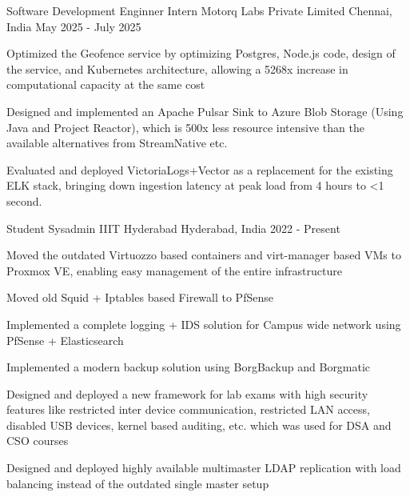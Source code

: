 
\begin{cventries}
  \cventry
  {Software Development Enginner Intern} %
  {Motorq Labs Private Limited} %
  {Chennai, India} %
  {May 2025 - July 2025} %
  {
  \begin{cvitems} %
    \item {Optimized the Geofence service by optimizing Postgres, Node.js code, design of the service, and Kubernetes architecture, allowing a 5268x increase in computational capacity at the same cost}
    \item {Designed and implemented an Apache Pulsar Sink to Azure Blob Storage (Using Java and Project Reactor), which is 500x less resource intensive than the available alternatives from StreamNative etc.}
    \item {Evaluated and deployed VictoriaLogs+Vector as a replacement for the existing ELK stack, bringing down ingestion latency at peak load from 4 hours to <1 second.}
  \end{cvitems}
  }

	\cventry
	  {Student Sysadmin} %
	  {IIIT Hyderabad} %
	  {Hyderabad, India} %
	  {2022 - Present} %
	  {
		\begin{cvitems} %
		  \item {Moved the outdated Virtuozzo based containers and virt-manager based VMs to Proxmox VE, enabling easy management of the entire infrastructure}
		  \item {Moved old Squid + Iptables based Firewall to PfSense}
		  \item {Implemented a complete logging + IDS solution for Campus wide network using PfSense + Elasticsearch}
		  \item {Implemented a modern backup solution using BorgBackup and Borgmatic}
		  \item {Designed and deployed a new framework for lab exams with high security features like restricted inter device communication, restricted LAN access, disabled USB devices, kernel based auditing, etc. which was used for DSA and CSO courses}
		  \item {Designed and deployed highly available multimaster LDAP replication with load balancing instead of the outdated single master setup}
		\end{cvitems}
	  }


\end{cventries}
